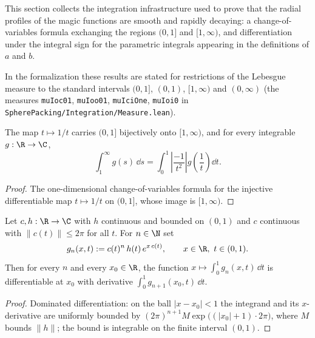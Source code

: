 This section collects the integration infrastructure used to prove that the radial profiles of
the magic functions are smooth and rapidly decaying: a change-of-variables formula exchanging the
regions $(0,1]$ and $[1,\infty)$, and differentiation under the integral sign for the parametric
integrals appearing in the definitions of $a$ and $b$.

In the formalization these results are stated for restrictions of the Lebesgue measure to the
standard intervals $(0,1]$, $(0,1)$, $[1,\infty)$ and $(0,\infty)$ (the measures
\texttt{muIoc01}, \texttt{muIoo01}, \texttt{muIciOne}, \texttt{muIoi0} in
\texttt{SpherePacking/Integration/Measure.lean}).

\begin{lemma}\label{lemma:inv-change-of-variables}\leanok
  The map $t \mapsto 1/t$ carries $(0, 1]$ bijectively onto $[1, \infty)$, and for every
  integrable $g : \R \to \C$,
  \[
    \int_1^{\infty} g(s) \,\dd s
      = \int_0^1 \left| \frac{-1}{t^2} \right| g\!\left(\frac{1}{t}\right) \dd t.
  \]
\end{lemma}
\begin{proof}\leanok
  The one-dimensional change-of-variables formula for the injective differentiable map
  $t \mapsto 1/t$ on $(0,1]$, whose image is $[1,\infty)$.
\end{proof}

\begin{lemma}\label{lemma:hasDerivAt-integral-Ioo01}\leanok
  Let $c, h : \R \to \C$ with $h$ continuous and bounded on $(0,1)$ and $c$ continuous with
  $\|c(t)\| \le 2\pi$ for all $t$. For $n \in \N$ set
  \[
    g_n(x, t) := c(t)^n\, h(t)\, e^{x\, c(t)}, \qquad x \in \R,\ t \in (0,1).
  \]
  Then for every $n$ and every $x_0 \in \R$, the function
  $x \mapsto \int_0^1 g_n(x,t) \,\dd t$ is differentiable at $x_0$ with derivative
  $\int_0^1 g_{n+1}(x_0,t) \,\dd t$.
\end{lemma}
\begin{proof}\leanok
  Dominated differentiation: on the ball $|x - x_0| < 1$ the integrand and its $x$-derivative are
  uniformly bounded by
  $(2\pi)^{n+1} M \exp\bigl((|x_0|+1) \cdot 2\pi\bigr)$, where $M$ bounds $\|h\|$; the bound is
  integrable on the finite interval $(0,1)$.
\end{proof}


